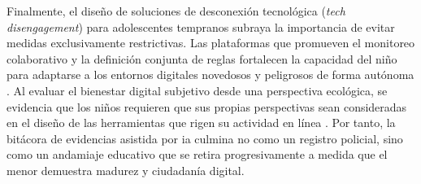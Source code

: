 Finalmente, el diseño de soluciones de desconexión tecnológica (\textit{tech disengagement}) para adolescentes tempranos subraya la importancia de evitar medidas exclusivamente restrictivas. Las plataformas que promueven el monitoreo colaborativo y la definición conjunta de reglas fortalecen la capacidad del niño para adaptarse a los entornos digitales novedosos y peligrosos de forma autónoma \cite{chowdhury_landscape_2025, ziker_parentchild_2025}. Al evaluar el bienestar digital subjetivo desde una perspectiva ecológica, se evidencia que los niños requieren que sus propias perspectivas sean consideradas en el diseño de las herramientas que rigen su actividad en línea \cite{holmarsdottir_integrative_2025}. Por tanto, la bitácora de evidencias asistida por \gls{ia} culmina no como un registro policial, sino como un andamiaje educativo que se retira progresivamente a medida que el menor demuestra madurez y ciudadanía digital.